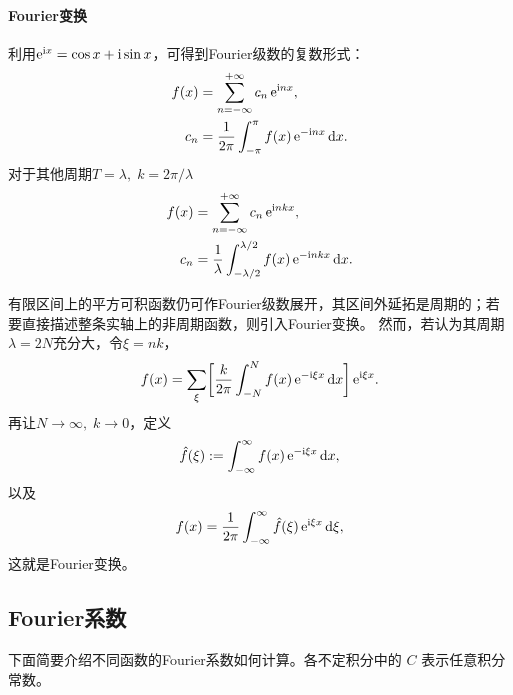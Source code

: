 \paragraph{Fourier变换}
利用$\mathop{}\!\mathrm{e}^{\mathrm{i} x} = \cos x + \mathrm{i}\sin x$，可得到Fourier级数的复数形式：
\begin{subequations}
	\label{eq:mmp-complex-fourier-series}
	\begin{align}
		f(x) &= \sum_{n=-\infty}^{+\infty}c_n\mathop{}\!\mathrm{e}^{\mathrm{i} nx},\\
		c_n &= \frac1{2\pi}\int_{-\pi}^\pi f(x)\mathop{}\!\mathrm{e}^{-\mathrm{i} nx}\mathop{}\!\mathrm{d} x.
	\end{align}
\end{subequations}
对于其他周期$T = \lambda,\;k = 2\pi/\lambda$
\begin{subequations}
	\label{eq:mmp-periodic-fourier-series}
	\begin{align}
		f(x) &= \sum_{n=-\infty}^{+\infty}c_n\mathop{}\!\mathrm{e}^{\mathrm{i} nkx},\\
		c_n &= \frac1\lambda\int_{-\lambda/2}^{\lambda/2} f(x)\mathop{}\!\mathrm{e}^{-\mathrm{i} nkx}\mathop{}\!\mathrm{d} x.
	\end{align}
\end{subequations}

有限区间上的平方可积函数仍可作Fourier级数展开，其区间外延拓是周期的；若要直接描述整条实轴上的非周期函数，则引入Fourier变换。
然而，若认为其周期$\lambda = 2N$充分大，令$\xi = nk$，
\[f(x) = \sum_\xi\biggl[\frac{k}{2\pi}\int_{-N}^Nf(x)\mathop{}\!\mathrm{e}^{-\mathrm{i}\xi x}\mathop{}\!\mathrm{d} x\biggr]\mathop{}\!\mathrm{e}^{\mathrm{i}\xi x}.\]
再让$N \to \infty,\;k \to 0$，定义
\[\hat f(\xi) := \int_{-\infty}^\infty f(x)\mathop{}\!\mathrm{e}^{-\mathrm{i}\xi x}\mathop{}\!\mathrm{d} x,\]
以及
\[f(x) = \frac1{2\pi}\int_{-\infty}^\infty\hat f(\xi)\mathop{}\!\mathrm{e}^{\mathrm{i}\xi x}\mathop{}\!\mathrm{d}\xi,\]
这就是Fourier变换。

\subsection{Fourier系数}

下面简要介绍不同函数的Fourier系数如何计算。各不定积分中的 $C$ 表示任意积分常数。

